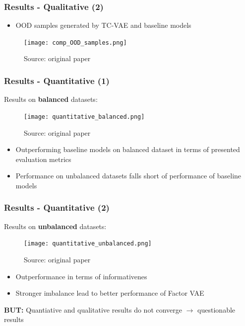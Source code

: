 \documentclass{beamer}
\theoremstyle{definition}
\begin{document}
    \begin{frame}
      \frametitle{Results - Qualitative (2)}
      \begin{itemize}
        \item OOD samples generated by TC-VAE and baseline models
      \end{itemize}
      \begin{figure}
        \centering
        \texttt{[image: comp\_OOD\_samples.png]}
        \captionsetup{justification=centering}
        \caption*{\tiny{Source: original paper}}
      \end{figure}
    \end{frame}

    \begin{frame}
      \frametitle{Results - Quantitative (1)}
      Results on \textbf{balanced} datasets:
      \begin{figure}
        \centering
        \texttt{[image: quantitative\_balanced.png]}
        \captionsetup{justification=centering}
        \caption*{\tiny{Source: original paper}}
      \end{figure}
      \begin{itemize}
        \item Outperforming baseline models on balanced dataset in terms of presented evaluation metrics

        \item Performance on unbalanced datasets falls short of performance of baseline models
      \end{itemize}
    \end{frame}

    \begin{frame}
      \frametitle{Results - Quantitative (2)}
      Results on \textbf{unbalanced} datasets:
      \begin{figure}
        \centering
        \texttt{[image: quantitative\_unbalanced.png]}
        \captionsetup{justification=centering}
        \caption*{\tiny{Source: original paper}}
      \end{figure}
      \begin{itemize}
        \item Outperformance in terms of informativenes
        \item Stronger imbalance lead to better performance of Factor VAE
      \end{itemize}
    \textbf{BUT:} Quantiative and qualitative results do not converge $\rightarrow$ questionable results
    \end{frame}
\end{document}
